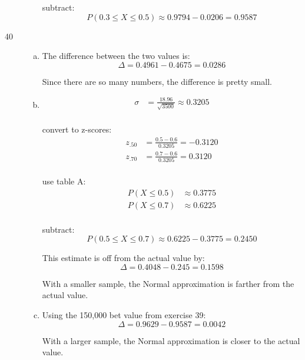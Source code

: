 \documentclass[letterpaper]{exam}
\begin{document}
\begin{description}
\begin{enumerate}[(a)]
            subtract:
            \[
              P(0.3 \leq X \leq 0.5) \approx 0.9794 - 0.0206 = \boxed{ 0.9587 }
            \]

        \end{enumerate}

      \item[40]
        \begin{enumerate}[(a)]
          \item The difference between the two values is:
            \[
              \Delta = 0.4961 - 0.4675 = \boxed{ 0.0286 }
            \]

            Since there are so many numbers, the difference is pretty small.

          \item
            \begin{align*}
              \sigma &= \frac{18.96}{\sqrt{3500}} \approx 0.3205 \\
            \end{align*}
            
            convert to z-scores:
            \begin{align*}
              z_{.50} &= \frac{0.5 - 0.6}{0.3205} = -0.3120 \\
              z_{.70} &= \frac{0.7 - 0.6}{0.3205} = 0.3120 \\
            \end{align*}

            use table A:\@
            \begin{align*}
              P(X \leq 0.5) & \approx 0.3775 \\
              P(X \leq 0.7) & \approx 0.6225 \\
            \end{align*}

            subtract:
            \[
              P(0.5 \leq X \leq 0.7) \approx 0.6225 - 0.3775 = 0.2450
            \]

            This estimate is off from the actual value by:
            \[
              \Delta = 0.4048 - 0.245 = \boxed{ 0.1598 }
            \]

            With a smaller sample, the Normal approximation is farther from the
            actual value.
            
          \item Using the 150,000 bet value from exercise 39:
            \[
              \Delta = 0.9629 - 0.9587 = \boxed{ 0.0042 }
            \]

            With a larger sample, the Normal approximation is closer to the
            actual value.

        \end{enumerate}
  \end{description}
\end{document}
